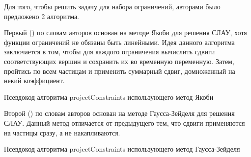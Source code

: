 	Для того, чтобы решить задачу для набора ограничений, авторами было предложено 2 алгоритма. 
	
	Первый () по словам авторов основан на методе Якоби для решения СЛАУ, хотя функции ограничений не обязаны быть линейными. Идея данного алгоритма заключается в том, чтобы для каждого ограничения вычислить сдвиги соответствующих вершин и сохранить их во временную переменную. Затем, пройтись по всем частицам и применить суммарный сдвиг, домноженный на некий коэффициент.
	
	\begin{algorithm} %
		\nonl{}
		\caption{Псевдокод алгоритма projectConstraints использующего метод Якоби}\label{alg:projectConstraintsJacobi}
	\end{algorithm}
	\FloatBarrier

	Второй () по словам авторов основан на методе Гаусса-Зейделя для решения СЛАУ. Данный метод отличается от предыдущего тем, что сдвиги применяются на частицы сразу, а не накапливаются.


	\begin{algorithm} %
	\nonl{}
	\caption{Псевдокод алгоритма projectConstraints использующего метод Гаусса-Зейделя}\label{alg:projectConstraintsGauss}
	\end{algorithm}
	\FloatBarrier
	
